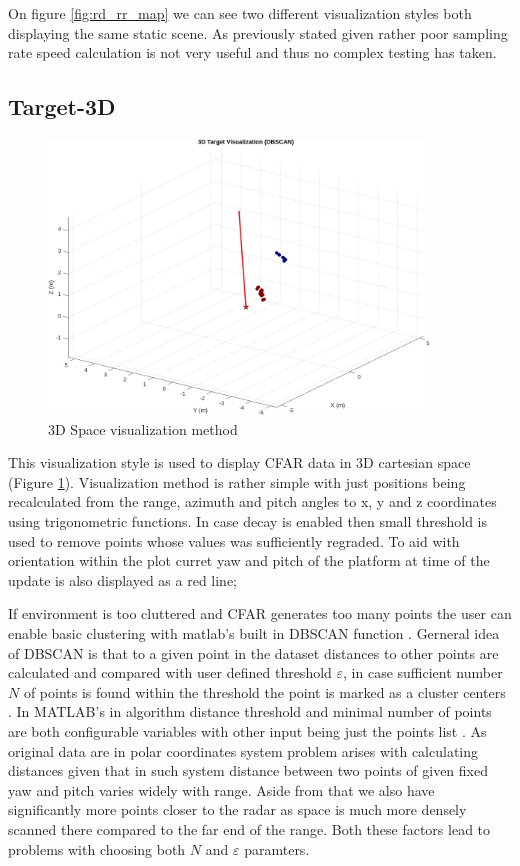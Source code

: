 On figure \ref{fig:rd_rr_map} we can see two different visualization styles both displaying the same static scene.
As previously stated given rather poor sampling rate speed calculation is not very useful and thus no complex testing has taken.

\newpage
\subsection{Target-3D}

\begin{figure}[h!]
	\centering
	\includegraphics[width=0.9\textwidth]{../img/vis_3d.jpg}
	\caption[3D Space visualization method]{3D Space visualization method}
	\label{fig:vis3d}
\end{figure}

This visualization style is used to display CFAR data in 3D cartesian space (Figure \ref{fig:vis3d}).
Visualization method is rather simple with just positions being recalculated from the range, azimuth and pitch angles to x, y and z coordinates using trigonometric functions.
In case decay is enabled then small threshold is used to remove points whose values was sufficiently regraded.
To aid with orientation within the plot curret yaw and pitch of the platform at time of the update is also displayed as a red line;

If environment is too cluttered and CFAR generates too many points the user can enable basic clustering with matlab's built in DBSCAN function \cite{matlab_dbscan}.
Gerneral idea of DBSCAN is that to a given point in the dataset distances to other points are calculated and compared with user defined threshold $\varepsilon$, in case sufficient number $N$ of points is found within the threshold the point is marked as a cluster centers \cite{Kellner2012}.
In MATLAB's in algorithm distance threshold and minimal number of points are both configurable variables with other input being just the points list \cite{matlab_dbscan}.
As original data are in polar coordinates system problem arises with calculating distances given that in such system distance between two points of given fixed yaw and pitch varies widely with range.
Aside from that we also have significantly more points closer to the radar as space is much more densely scanned there compared to the far end of the range.
Both these factors lead to problems with choosing both $N$ and $\varepsilon$ paramters.

